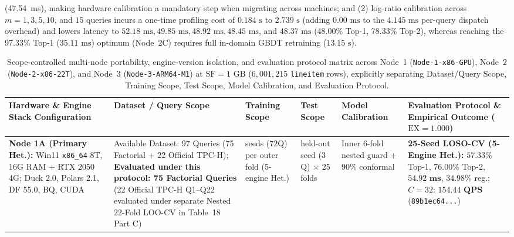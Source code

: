 \documentclass[10pt,a4paper]{article}
\newenvironment{fitasttable}{%
  \begin{lrbox}{\asttblbox}%
}{%
  \end{lrbox}%
  \sbox{\asttblboxB}{%
    \ifdim\wd\asttblbox>0.96\textwidth
      \resizebox{0.96\textwidth}{!}{\usebox{\asttblbox}}%
    \else
      \usebox{\asttblbox}%
    \fi
  }%
  \ifdim\ht\asttblboxB>0.72\textheight
    \resizebox{!}{0.72\textheight}{\usebox{\asttblboxB}}%
  \else
    \usebox{\asttblboxB}%
  \fi
}
\begin{document}
(47.54~ms), making hardware calibration a mandatory step when migrating across machines; and (2) log-ratio calibration across $m=1, 3, 5, 10$, and $15$ queries incurs a one-time profiling cost of $0.184\text{ s}$ to $2.739\text{ s}$ (adding $0.00\text{ ms}$ to the $4.145\text{ ms}$ per-query dispatch overhead) and lowers latency to $52.18\text{ ms}, 49.85\text{ ms}, 48.92\text{ ms}, 48.45\text{ ms}$, and $48.37\text{ ms}$ (48.00\% Top-1, 78.33\% Top-2), whereas reaching the 97.33\% Top-1 ($35.11\text{ ms}$) optimum (Node~2C) requires full in-domain GBDT retraining ($13.15\text{ s}$).

\begin{table}[!htbp]
\centering
\caption{Scope-controlled multi-node portability, engine-version isolation, and evaluation protocol matrix across Node~1 (\texttt{Node-1-x86-GPU}), Node~2 (\texttt{Node-2-x86-22T}), and Node~3 (\texttt{Node-3-ARM64-M1}) at $\text{SF}=1\text{ GB}$ ($6{,}001{,}215$ \texttt{lineitem} rows), explicitly separating Dataset/Query Scope, Training Scope, Test Scope, Model Calibration, and Evaluation Protocol.}\label{tab:three_node_cross_isa}\label{tab:jbd_multinode_t15}
\setlength{\tabcolsep}{2.8pt}
\renewcommand{\arraystretch}{1.12}
\scriptsize
\begin{fitasttable}
\begin{tabular}{@{}>{\raggedright\arraybackslash}p{2.9cm}>{\raggedright\arraybackslash}p{2.5cm}>{\raggedright\arraybackslash}p{2.2cm}>{\raggedright\arraybackslash}p{2.1cm}>{\raggedright\arraybackslash}p{2.3cm}>{\raggedright\arraybackslash}p{4.6cm}@{}}
\toprule
\textbf{Hardware \& Engine Stack Configuration} & \textbf{Dataset / Query Scope} & \textbf{Training Scope} & \textbf{Test Scope} & \textbf{Model Calibration} & \textbf{Evaluation Protocol \& Empirical Outcome ($\text{EX}=1.000$)} \\
\midrule
\textbf{Node 1A (Primary Het.):} Win11 \texttt{x86\_\allowbreak{}64} 8T, 16G RAM + RTX 2050 4G; Duck 2.0, Polars 2.1, DF 55.0, BQ, CUDA & Available Dataset: 97 Queries (75 Factorial + 22 Official TPC-H); \textbf{Evaluated under this protocol: 75 Factorial Queries} (22 Official TPC-H Q1--Q22 evaluated under separate Nested 22-Fold LOO-CV in Table~18 Part C) & 24 seeds ($72$Q) per outer fold (5-engine Het.) & 1 held-out seed ($3$Q) $\times$ 25 folds & Inner 6-fold nested guard + 90\% conformal & \textbf{25-Seed LOSO-CV (5-Engine Het.):} $57.33\%$ Top-1, $76.00\%$ Top-2, $\mathbf{54.92\text{ ms}}$, $34.98\%$ reg.; $C=32$: $\mathbf{154.44\text{ QPS}}$ (\texttt{89b1ec64...}) \\

\end{tabular}
\end{fitasttable}
\end{table}
\end{document}
